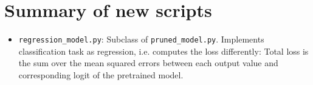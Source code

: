 \documentclass[10pt,twocolumn,letterpaper]{article}
\begin{document}
\section{Summary of new scripts}
\begin{itemize}
	\item \texttt{regression\_model.py}: Subclass of \texttt{pruned\_model.py}.
		Implements classification task as regression, i.e. computes the loss differently:
		Total loss is the sum over the mean squared errors between each output value and corresponding logit of the pretrained model.
\end{itemize}
{\small


}
\end{document}
